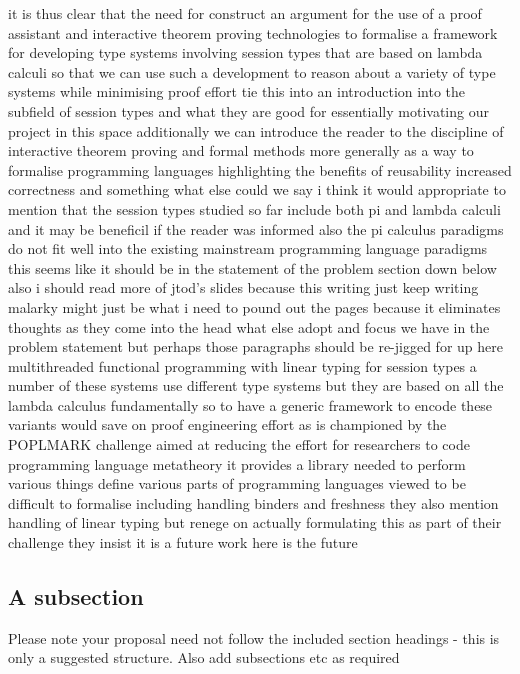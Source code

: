 \documentclass{mprop}
\begin{document}
it is thus clear that the need for
construct an argument for the use of a proof assistant and interactive theorem
proving technologies to formalise a framework for developing type systems
involving session types that are based on lambda calculi so that we can use
such a development to reason about a variety of type systems while minimising
proof effort tie this into an introduction into the subfield of session types
and what they are good for essentially motivating our project in this space
additionally we can introduce the reader to the discipline of interactive
theorem proving and formal methods more generally as a way to formalise
programming languages highlighting the benefits of reusability increased
correctness and something what else could we say i think it would appropriate
to mention that the session types studied so far include both pi and lambda
calculi and it may be beneficil if the reader was informed also the pi
calculus paradigms do not fit well into the existing mainstream programming
language paradigms this seems like it should be in the statement of the problem section down below also i should read more of jtod's slides because this writing just keep writing malarky might just be what i need to pound out the pages because it eliminates thoughts as they come into the head what else adopt and focus we have in the problem statement but perhaps those paragraphs should be re-jigged for up here multithreaded functional programming with linear typing for session types a number of these systems use different type systems but they are based on all the lambda calculus fundamentally so to have a generic framework to encode these variants would save on proof engineering effort as is championed by the POPLMARK challenge aimed at reducing the effort for researchers to code programming language metatheory it provides a library needed to perform various things define various parts of programming languages viewed to be difficult to formalise including handling binders and freshness they also mention handling of linear typing but renege on actually formulating this as part of their challenge they insist it is a future work here is the future

\subsection{A subsection}
Please note your proposal need not follow the included section headings - this
is only a suggested structure. Also add subsections etc as required

\end{document}
